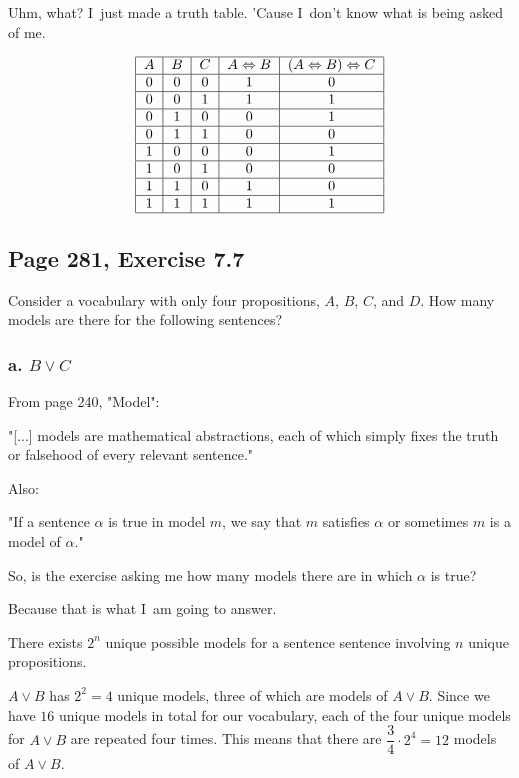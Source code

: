\documentclass{article}
\begin{document}
Uhm, what? I\ just made a truth table. 'Cause I\ don't know what is being
asked of me.

\[
\begin{tabular}{|c|c|c|c|c|}
\hline
$A$ & $B$ & $C$ & $A\Leftrightarrow B$ & $\left( A\Leftrightarrow B\right)
\Leftrightarrow C$ \\ \hline
0 & 0 & 0 & 1 & 0 \\ \hline
0 & 0 & 1 & 1 & 1 \\ \hline
0 & 1 & 0 & 0 & 1 \\ \hline
0 & 1 & 1 & 0 & 0 \\ \hline
1 & 0 & 0 & 0 & 1 \\ \hline
1 & 0 & 1 & 0 & 0 \\ \hline
1 & 1 & 0 & 1 & 0 \\ \hline
1 & 1 & 1 & 1 & 1 \\ \hline
\end{tabular}%
\]

\bigskip

\subsection{Page 281, Exercise 7.7}

Consider a vocabulary with only four propositions, $A$, $B$, $C$, and $D$.
How many models are there for the following sentences?

\subsubsection{a. $B\vee C$}

From page 240, "Model":

"[...] models are mathematical abstractions, each of which simply fixes the
truth or falsehood of every relevant sentence."

Also:

"If a sentence $\alpha $ is true in model $m$, we say that $m$ satisfies $%
\alpha $ or sometimes $m$ is a model of $\alpha $."

So, is the exercise asking me how many models there are in which $\alpha $
is true?

Because that is what I\ am going to answer.

There exists $2^{n}$ unique possible models for a sentence sentence
involving $n$ unique propositions.

$A\vee B$ has $2^{2}=\allowbreak 4$ unique models, three of which are models
of $A\vee B$. Since we have $16$ unique models in total for our vocabulary,
each of the four unique models for $A\vee B$ are repeated four times. This
means that there are $\dfrac{3}{4}\cdot 2^{4}=\allowbreak 12$ models of $%
A\vee B$.
\end{document}
